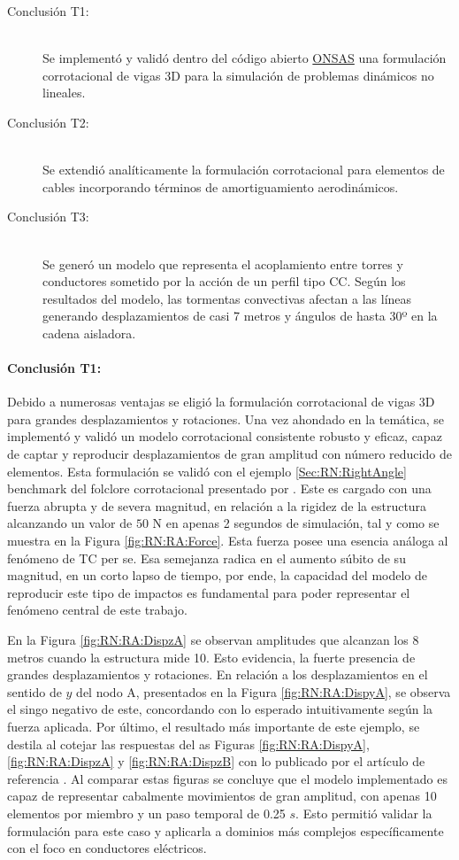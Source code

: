\begin{description}
	\item[Conclusión T1:] \hfill \\ Se implementó y validó dentro del código abierto \href{https://github.com/ONSAS/ONSAS.m/}{ONSAS} una formulación corrotacional de vigas 3D para la simulación de problemas dinámicos no lineales.
	\item[Conclusión T2:] \hfill \\ Se extendió analíticamente la formulación corrotacional para elementos de cables incorporando términos de amortiguamiento aerodinámicos.
	\item[Conclusión T3:] \hfill \\ Se generó un modelo que representa el acoplamiento entre torres y conductores sometido por la acción de un perfil tipo CC. Según los resultados del modelo, las tormentas convectivas afectan a las líneas generando desplazamientos de casi 7 metros y ángulos de hasta 30º en la cadena aisladora. 
\end{description}

\paragraph*{Conclusión T1:}
Debido a numerosas ventajas se eligió la formulación corrotacional de vigas 3D para grandes desplazamientos y rotaciones. Una vez ahondado en la temática, se implementó y validó un modelo corrotacional consistente robusto y eficaz, capaz de captar y reproducir desplazamientos de gran amplitud con número reducido de elementos. Esta formulación se validó con el ejemplo \ref{Sec:RN:RightAngle} benchmark del folclore corrotacional presentado por \cite{simo1988dynamics}. Este es cargado con una fuerza abrupta y de severa magnitud, en relación a la rigidez de la estructura alcanzando un valor de $50$ N en apenas 2 segundos de simulación, tal y como se muestra en la Figura \ref{fig:RN:RA:Force}. Esta fuerza posee una esencia análoga al fenómeno de TC per se. Esa semejanza radica en el aumento súbito de su magnitud, en un corto lapso de tiempo, por ende, la capacidad del modelo de reproducir este tipo de impactos es fundamental para poder representar el fenómeno central de este trabajo.

En la Figura \ref{fig:RN:RA:DispzA} se observan amplitudes que alcanzan los 8 metros cuando la estructura mide 10. Esto evidencia, la fuerte presencia de grandes desplazamientos y rotaciones.  En relación a los desplazamientos en el sentido de $y$ del nodo A, presentados en la Figura \ref{fig:RN:RA:DispyA}, se observa el singo negativo de este, concordando con lo esperado intuitivamente según la fuerza aplicada. Por último, el resultado más importante de este ejemplo, se destila al cotejar las respuestas del as Figuras \ref{fig:RN:RA:DispyA}, \ref{fig:RN:RA:DispzA} y \ref{fig:RN:RA:DispzB} con lo publicado por el artículo de referencia \citep{Le2014}. Al comparar estas figuras se concluye que el modelo implementado es capaz de representar cabalmente movimientos de gran amplitud, con apenas 10 elementos por miembro y un paso temporal de 0.25 $s$. Esto permitió validar la formulación para este caso y aplicarla a dominios más complejos específicamente con el foco en conductores eléctricos. 

